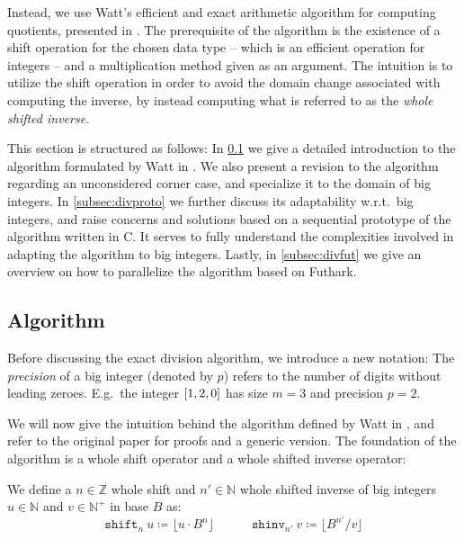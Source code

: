 Instead, we use Watt's efficient and exact arithmetic algorithm for computing
quotients, presented in \cite{watt2023efficient}. The prerequisite of the
algorithm is the existence of a shift operation for the chosen data type -- which
is an efficient operation for integers -- and a multiplication method given as an
argument. The intuition is to utilize the shift operation in order to avoid the
domain change associated with computing the inverse, by instead computing what
is referred to as the \textit{whole shifted inverse}.

This section is structured as follows: In \ref{subsec:divalg} we give a detailed
introduction to the algorithm formulated by Watt in \cite{watt2023efficient}. We
also present a revision to the algorithm regarding an unconsidered corner case,
and specialize it to the domain of big integers. In \ref{subsec:divproto} we
further discuss its adaptability w.r.t.\ big integers, and raise concerns and
solutions based on a sequential prototype of the algorithm written in C. It
serves to fully understand the complexities involved in adapting the algorithm
to big integers. Lastly, in \ref{subsec:divfut} we give an overview on how to
parallelize the algorithm based on Futhark.

\subsection{Algorithm}
\label{subsec:divalg}

Before discussing the exact division algorithm, we introduce a new notation: The
\textit{precision} of a big integer (denoted by $p$) refers to the number of
digits without leading zeroes. E.g.\ the integer $\mathtt{[}1,2,0\mathtt{]}$ has size $m=3$
and precision $p=2$.

We will now give the intuition behind the algorithm defined by Watt in
\cite{watt2023efficient}, and refer to the original paper for proofs and a
generic version. The foundation of the algorithm is a whole shift operator and a
whole shifted inverse operator:

\begin{definition}\label{def:shifts}
  We define a $n \in \mathbb{Z}$ whole shift and $n' \in \mathbb{N}$ whole shifted inverse of big
  integers $u\in \mathbb{N}$ and $v\in \mathbb{N}^{+}$ in base $B$ as:
  \begin{equation}\label{eq:shifts}
    \mathtt{shift}_n~u \coloneq \lfloor u \cdot B^n \rfloor \quad \qquad \mathtt{shinv}_{n'}~v \coloneq \lfloor B^{n'}/ v \rfloor
    \end{equation}
\end{definition}

